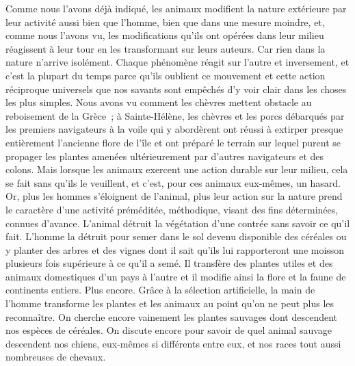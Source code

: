 \documentclass[french,twoside]{book} %
\begin{document}
Comme nous l’avons déjà indiqué, les animaux modifient la nature extérieure par leur activité aussi bien que l’homme, bien que dans une mesure moindre, et, comme nous l’avons vu, les modifications qu’ils ont opérées dans leur milieu réagissent à leur tour en les transformant sur leurs auteurs. Car rien dans la nature n’arrive isolément. Chaque phénomène réagit sur l’autre et inversement, et c’est la plupart du temps parce qu’ils oublient ce mouvement et cette action réciproque universels que nos savants sont empêchés d’y voir clair dans les choses les plus simples. Nous avons vu comment les chèvres mettent obstacle au reboisement de la Grèce ; à Sainte-Hélène, les chèvres et les porcs débarqués par les premiers navigateurs à la voile qui y abordèrent ont réussi à extirper presque entièrement l’ancienne flore de l’île et ont préparé le terrain sur lequel purent se propager les plantes amenées ultérieurement par d’autres navigateurs et des colons. Mais lorsque les animaux exercent une action durable sur leur milieu, cela se fait sans qu’ils le veuillent, et c’est, pour ces animaux eux-mêmes, un hasard. Or, plus les hommes s’éloignent de l’animal, plus leur action sur la nature prend le caractère d’une activité préméditée, méthodique, visant des fins déterminées, connues d’avance. L’animal détruit la végétation d’une contrée sans savoir ce qu’il fait. L’homme la détruit pour semer dans le sol devenu disponible des céréales ou y planter des arbres et des vignes dont il sait qu’ils lui rapporteront une moisson plusieurs fois supérieure à ce qu’il a semé. Il transfère des plantes utiles et des animaux domestiques d’un pays à l’autre et il modifie ainsi la flore et la faune de continents entiers. Plus encore. Grâce à la sélection artificielle, la main de l’homme transforme les plantes et les animaux au point qu’on ne peut plus les reconnaître. On cherche encore vainement les plantes sauvages dont descendent nos espèces de céréales. On discute encore pour savoir de quel animal sauvage descendent nos chiens, eux-mêmes si différents entre eux, et nos races tout aussi nombreuses de chevaux.\par
\end{document}
